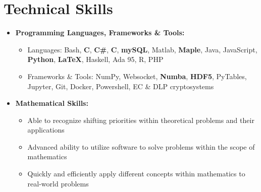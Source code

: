 \documentclass[10pt,letterpaper,sans]{moderncv}
\renewcommand{\_}{\textscale{.7}{\textunderscore}}
\newcommand{\Rplus}{\protect\hspace{-.1em}\protect\raisebox{.35ex}{\smaller{\smaller\textbf{+}}}}
\newcommand{\Cpp}{\mbox{C\Rplus\Rplus}\xspace}
\begin{document}
\section{Technical Skills}
\vspace{0.75em}
\begin{itemize}
\item \textbf{Programming Languages, Frameworks \& Tools:}
\begin{itemize}
    \item {Languages:} Bash, \textbf{C}, \textbf{C\#}, \textbf{\Cpp}, \textbf{mySQL}, Matlab, \textbf{Maple}, Java, JavaScript, \textbf{Python}, \textbf{\LaTeX}, Haskell, Ada 95, R, PHP
    \item {Frameworks \& Tools:} NumPy, Websocket, \textbf{Numba}, \textbf{HDF5}, PyTables, Jupyter, Git, Docker, Powershell, EC \& DLP cryptosystems
\end{itemize}
\vspace{0.5em}
\item \textbf{Mathematical Skills:}
\begin{itemize}
    \item Able to recognize shifting priorities within theoretical problems and their applications
    \item Advanced ability to utilize software to solve problems within the scope of mathematics
    \item Quickly and efficiently apply different concepts within mathematics to real-world problems
\end{itemize}
\end{itemize}
\vspace{0.5em}

\end{document}
